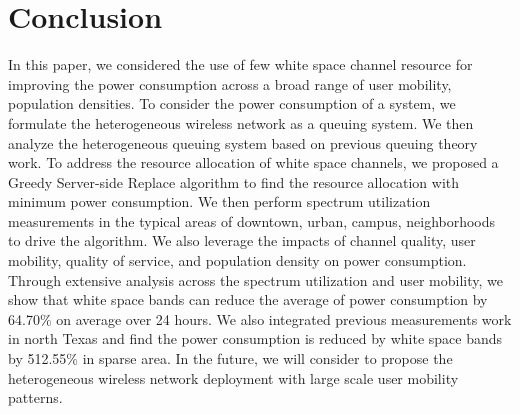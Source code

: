 \section{Conclusion}
\label{sec:conclusion}
In this paper, we considered the use of few white space channel resource 
for improving the power consumption across a broad range of user mobility, 
population densities. To consider the power consumption of a system, we 
formulate the heterogeneous wireless network as a queuing system. 
We then analyze the heterogeneous queuing system based on previous queuing 
theory work. To address the resource allocation of white space channels, 
we proposed a Greedy Server-side Replace algorithm to find the resource allocation 
with minimum power consumption. We then perform spectrum utilization 
measurements in the typical areas of downtown, urban, campus, neighborhoods 
to drive the algorithm. 
We also leverage the impacts of channel quality, user mobility, quality of service,
and population density on power consumption.
Through extensive analysis across the spectrum utilization 
and user mobility, we show that white space bands can reduce the average of 
power consumption by 64.70\% on average over 24 hours. We also integrated previous 
measurements work in north Texas and find the power consumption is reduced by white space
bands by 512.55\% in sparse area.
In the future, we will consider to propose the heterogeneous wireless network 
deployment with large scale user mobility patterns.

